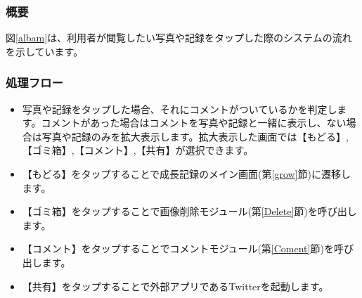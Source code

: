 \documentclass[a4j]{jarticle}
\begin{document}
\subsubsection*{概要}
図\ref{albam}は、利用者が閲覧したい写真や記録をタップした際のシステムの流れを示しています。

\subsubsection*{処理フロー}
\begin{itemize}
\item 写真や記録をタップした場合、それにコメントがついているかを判定します。コメントがあった場合はコメントを写真や記録と一緒に表示し、ない場合は写真や記録のみを拡大表示します。拡大表示した画面では【もどる】,【ゴミ箱】,【コメント】,【共有】が選択できます。
\item 【もどる】をタップすることで成長記録のメイン画面(第\ref{grow}節)に遷移します。
\item 【ゴミ箱】をタップすることで画像削除モジュール(第\ref{Delete}節)を呼び出します。
\item 【コメント】をタップすることでコメントモジュール(第\ref{Coment}節)を呼び出します。
\item 【共有】をタップすることで外部アプリであるTwitterを起動します。
\end{itemize}
\end{document}
